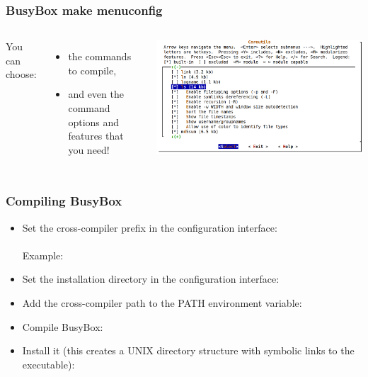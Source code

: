 \begin{frame}
  \frametitle{BusyBox make menuconfig}
  \begin{columns}
    You can choose:
    \begin{itemize}
    \item the commands to compile,
    \item and even the command options and features that you need!
    \end{itemize}
    \includegraphics[width=\textwidth]{slides/linux-busybox/menuconfig-screenshot.png}
  \end{columns}
\end{frame}

\begin{frame}
  \frametitle{Compiling BusyBox}
  \begin{itemize}
  \item Set the cross-compiler prefix in the configuration interface: \\
    \\
    Example: 
  \item Set the installation directory in the configuration interface: \\
  \item Add the cross-compiler path to the PATH environment variable:\\
  \item Compile BusyBox:\\
  \item Install it (this creates a UNIX directory structure with symbolic
    links to the  executable):\\
  \end{itemize}
\end{frame}

